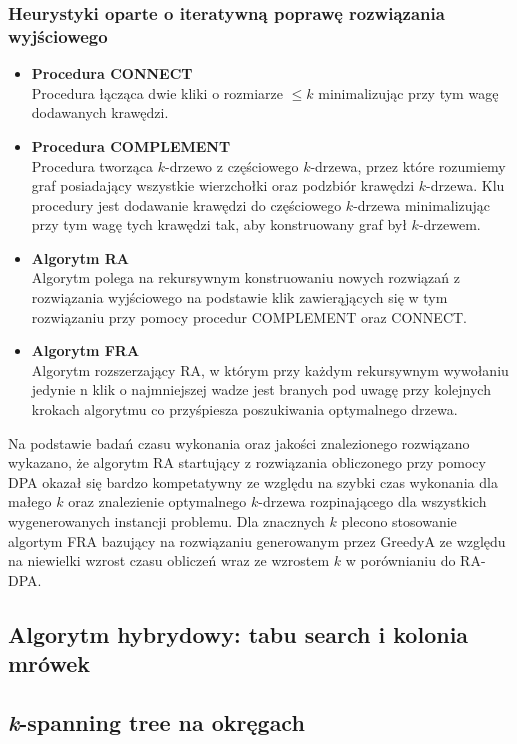 \documentclass[12pt]{article}
\begin{document}
\subsubsection{Heurystyki oparte o iteratywną poprawę rozwiązania wyjściowego}

\begin{itemize}
  \item \textbf{Procedura CONNECT}\\
        Procedura łącząca dwie kliki o rozmiarze $\leq k$ minimalizując przy tym wagę dodawanych krawędzi.
  \item \textbf{Procedura COMPLEMENT}\\
        Procedura tworząca $k$-drzewo z częściowego $k$-drzewa, przez które rozumiemy graf posiadający wszystkie wierzchołki oraz podzbiór krawędzi $k$-drzewa. Klu procedury jest dodawanie krawędzi do częściowego $k$-drzewa minimalizując przy tym wagę tych krawędzi tak, aby konstruowany graf był $k$-drzewem.
  \item \textbf{Algorytm RA}\\
        Algorytm polega na rekursywnym konstruowaniu nowych rozwiązań z rozwiązania wyjściowego na podstawie klik zawierąjących się w tym rozwiązaniu przy pomocy procedur COMPLEMENT oraz CONNECT.
  \item \textbf{Algorytm FRA}\\
        Algorytm rozszerzający RA, w którym przy każdym rekursywnym wywołaniu jedynie n klik o najmniejszej wadze jest branych pod uwagę przy kolejnych krokach algorytmu co przyśpiesza poszukiwania optymalnego drzewa.
\end{itemize}

Na podstawie badań czasu wykonania oraz jakości znalezionego rozwiązano wykazano, że algorytm RA startujący z rozwiązania obliczonego przy pomocy DPA okazał się bardzo kompetatywny ze względu na szybki czas wykonania dla małego $k$ oraz znalezienie optymalnego $k$-drzewa rozpinającego dla wszystkich wygenerowanych instancji problemu. Dla znacznych $k$ plecono stosowanie algortym FRA bazujący na rozwiązaniu generowanym przez GreedyA ze względu na niewielki wzrost czasu obliczeń wraz ze wzrostem $k$ w porównianiu do RA-DPA.

\subsection{Algorytm hybrydowy: tabu search i kolonia mrówek}



\subsection{\textit{k}-spanning tree na okręgach}



\newpage



\end{document}
